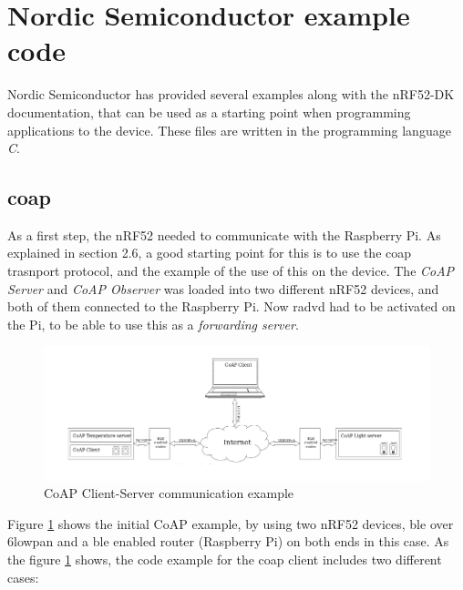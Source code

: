 



\section{Nordic Semiconductor example code}

Nordic Semiconductor has provided several examples along with the nRF52-DK documentation, that can be used as a starting point when programming applications to the device. These files are written in the programming language \textit{C}. 

\subsection{\gls{coap}}

As a first step, the nRF52 needed to communicate with the Raspberry Pi. As explained in section 2.6, a good starting point for this is to use the \gls{coap} trasnport protocol, and the example of the use of this on the device. The \textit{CoAP Server} and \textit{CoAP Observer} was loaded into two different nRF52 devices, and both of them connected to the Raspberry Pi. Now \gls{radvd} had to be activated on the Pi, to be able to use this as a \textit{forwarding server}. 

\begin{figure}[ht]
    \centering
    \includegraphics[width=1.0\textwidth]{CoAPExample2.png}    
    \caption{CoAP Client-Server communication example \cite{nordicNrfDocumentation}}
    \label{fig:CoAPexample1}
\end{figure}

Figure \ref{fig:CoAPexample1} shows the initial CoAP example, by using two nRF52 devices, \gls{ble} over \gls{6lowpan} and a \gls{ble} enabled router (Raspberry Pi) on both ends in this case. As the figure \ref{fig:CoAPexample1} shows, the code example for the \gls{coap} client includes two different cases: 

